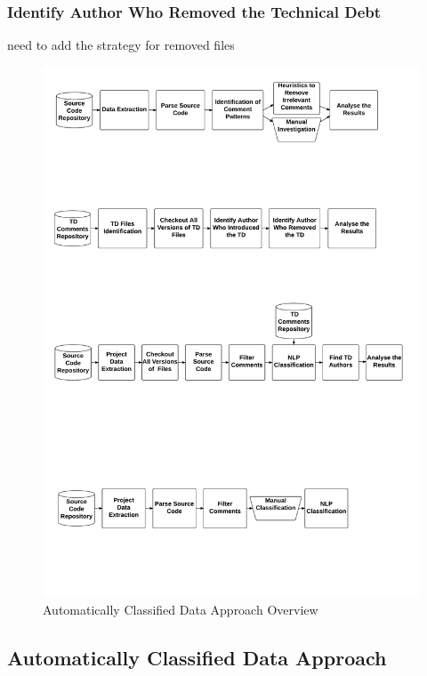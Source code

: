 \subsubsection*{Identify Author Who Removed the Technical Debt}
\label{subsub:identify_author_who_removed_the_technical_debt}
need to add the strategy for removed files

\begin{figure}[thb!]
  \centering
  \includegraphics[width=1\textwidth]{figures/automatically_classified_data_approach.pdf}
  \caption{Automatically Classified Data Approach Overview}
  \label{fig:automatically_classified_data_approach_overview}
\end{figure}

\subsection*{Automatically Classified Data Approach}
\label{sub:automatically_classified_data_approach}

